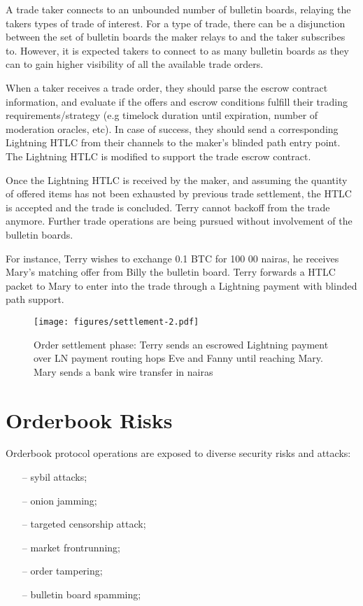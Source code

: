 \documentclass[pdflatex,sn-mathphys]{sn-jnl}%
\theoremstyle{thmstyleone}%
\theoremstyle{thmstyletwo}%
\theoremstyle{thmstylethree}%
\begin{document}
A trade taker connects to an unbounded number of bulletin boards, relaying the takers types of trade of interest. For a type of trade, there can be a disjunction between the set of bulletin boards the maker relays to and the taker subscribes to. However, it is expected takers to connect to as many bulletin boards as they can to gain higher visibility of all the available trade orders.

When a taker receives a trade order, they should parse the escrow contract information, and evaluate if the offers and escrow conditions fulfill their trading requirements/strategy (e.g timelock duration until expiration, number of moderation oracles, etc). In case of success, they should send a corresponding Lightning HTLC from their channels to the maker's blinded path entry point. The Lightning HTLC is modified to support the trade escrow contract.

Once the Lightning HTLC is received by the maker, and assuming the quantity of offered items has not been exhausted by previous trade settlement, the HTLC is accepted and the trade is concluded. Terry cannot backoff from the trade anymore. Further trade operations are being pursued without involvement of the bulletin boards.

For instance, Terry wishes to exchange 0.1 BTC for 100 00 nairas, he receives Mary’s matching offer from Billy the bulletin board. Terry forwards a HTLC packet to Mary to enter into the trade through a Lightning payment with blinded path support.

\begin{figure}[h]
    \centering
    \texttt{[image: figures/settlement-2.pdf]}
    \caption{Order settlement phase: Terry sends an escrowed Lightning payment over LN payment routing hops Eve and Fanny until reaching Mary. Mary sends a bank wire transfer in nairas}
    \label{fig:settlement}
\end{figure}

\section{Orderbook Risks}

Orderbook protocol operations are exposed to diverse security risks and attacks:
\begin{itemize}
    \item[--] sybil attacks;
    \item[--] onion jamming;
    \item[--] targeted censorship attack;
    \item[--] market frontrunning;
    \item[--] order tampering;
    \item[--] bulletin board spamming;
\end{itemize}
\end{document}
